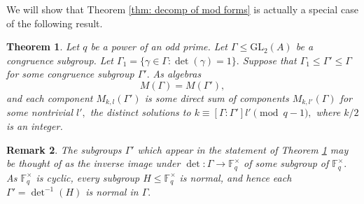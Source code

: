 \documentclass[11pt]{amsart}
\newtheorem{theorem}{Theorem}[section]
\newtheorem{remark}[theorem]{Remark}
\theoremstyle{definition}
\numberwithin{equation}{section}
\newcommand{\GL}{\mathrm{GL}} 	%
\newcommand{\bbF}{\mathbb{F}}		%
\begin{document}
We will show that Theorem \ref{thm: decomp of mod forms} is actually a special case of the following result.
\begin{theorem}
	\label{thm: generalized decomp}
	Let $q$ be a power of an odd prime. Let $\Gamma\leq \GL_2(A)$ be a congruence subgroup. Let $\Gamma_1=\{\gamma\in \Gamma: \det(\gamma)=1\}.$ Suppose that $\Gamma_1\leq \Gamma'\leq \Gamma$ for some congruence subgroup $\Gamma'.$ As algebras
	\[M(\Gamma)=M(\Gamma'),\] and each component $M_{k,l}(\Gamma')$ is some direct sum of components $M_{k,l'}(\Gamma)$ for some nontrivial $l',$ the distinct solutions to $k\equiv [\Gamma:\Gamma']l'\pmod{q-1},$ where $k/2$ is an integer.
\end{theorem}
\begin{remark}
	The subgroups $\Gamma'$ which appear in the statement of Theorem \ref{thm: generalized decomp} may be thought of as the inverse image under $\det:\Gamma\to \bbF_q^{\times}$ of some subgroup of $\bbF_q^{\times}.$ As $\bbF_q^{\times}$ is cyclic, every subgroup $H\leq \bbF_q^{\times}$ is normal, and hence each $\Gamma'=\det^{-1}(H)$ is normal in $\Gamma.$
\end{remark}
\end{document}
